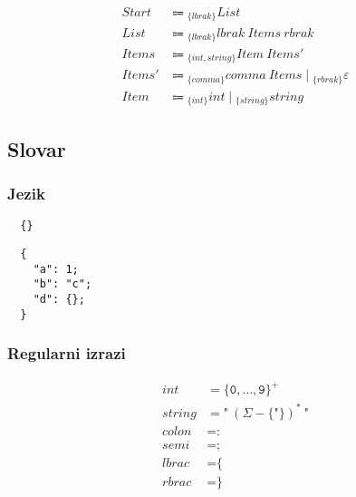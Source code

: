 \documentclass{report}
\newcommand{\Null}{\varepsilon}
\newcommand{\Alphabet}{\Sigma}
\newcommand{\Char}[1]{\texttt{#1}}
\newcommand{\Spc}{\ }
\newcommand{\Union}{\mathrel{|}}
\newcommand{\Kleene}[1]{{#1}^\ast}
\newcommand{\KleenePlus}[1]{#1^+}
\newcommand{\Arrow}{\Coloneq}
\newcommand{\NT}[1]{{#1}}
\newcommand{\T}[1]{{#1}}
\newcommand{\Lookahead}[1]{{}_{\{{#1}\}}}
\begin{document}
\begin{equation*}
  \begin{aligned}
    \NT{Start} &\Arrow \Lookahead{\T{lbrak}} \NT{List}\\
    \NT{List} &\Arrow \Lookahead{\T{lbrak}} \T{lbrak} \Spc \NT{Items} \Spc \T{rbrak}\\
    \NT{Items} &\Arrow \Lookahead{\T{int}, \T{string}} \NT{Item} \Spc \NT{Items'}\\
    \NT{Items'} &\Arrow \Lookahead{\T{comma}} \T{comma} \Spc \NT{Items} \Union \Lookahead{\T{rbrak}} \Null\\
    \NT{Item} &\Arrow \Lookahead{\T{int}} \T{int} \Union \Lookahead{\T{string}} \T{string}
  \end{aligned}
\end{equation*}

\subsection{Slovar}

\subsubsection*{Jezik}
\begin{verbatim}
  {}
\end{verbatim}
\begin{verbatim}
  {
    "a": 1;
    "b": "c";
    "d": {};
  }
\end{verbatim}

\subsubsection*{Regularni izrazi}
\begin{equation*}
  \begin{aligned}
    \T{int} &= \KleenePlus{\{\Char{0}, \dots, \Char{9}\}}\\
    \T{string} &= \Char{"} \Spc \Kleene{(\Alphabet - \{\Char{"}\})} \Spc \Char{"}\\
    \T{colon} &= \Char{:}\\
    \T{semi} &= \Char{;}\\
    \T{lbrac} &= \Char{\{}\\
    \T{rbrac} &= \Char{\}}\\
  \end{aligned}
\end{equation*}
\end{document}

